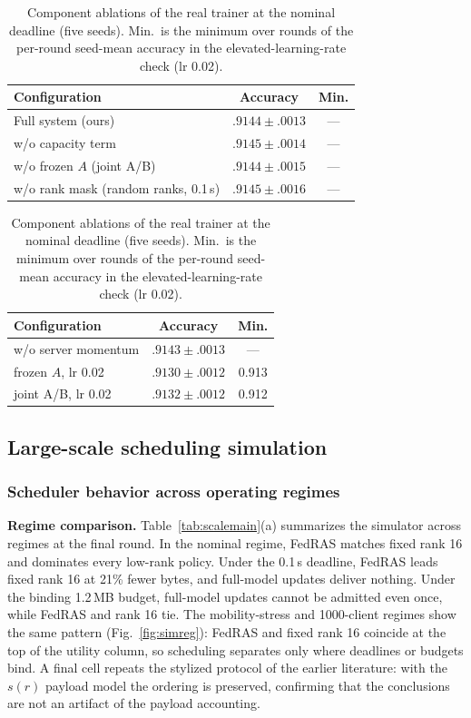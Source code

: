\documentclass[a4paper,fleqn]{cas-dc}
\begin{document}
\begin{table}[pos=tbp]
\centering\footnotesize
\caption{Component ablations of the real trainer at the nominal deadline (five seeds). Min.\ is the minimum over rounds of the per-round seed-mean accuracy in the elevated-learning-rate check (lr 0.02).}
\label{tab:ablation}
\begin{tabular}{l cc}
\toprule
Configuration & Accuracy & Min.\\
\midrule
Full system (ours) & $.9144\pm.0013$ & ---\\
w/o capacity term & $.9145\pm.0014$ & ---\\
w/o frozen $A$ (joint A/B) & $.9144\pm.0015$ & ---\\
w/o rank mask (random ranks, 0.1\,s) & $.9145\pm.0016$ & ---\\
\end{tabular}
\hfill
\begin{tabular}{l cc}
\toprule
Configuration & Accuracy & Min.\\
\midrule
w/o server momentum & $.9143\pm.0013$ & ---\\
frozen $A$, lr 0.02 & $.9130\pm.0012$ & 0.913\\
joint A/B, lr 0.02 & $.9132\pm.0012$ & 0.912\\
\bottomrule
\end{tabular}
\end{table}


\subsection{Large-scale scheduling simulation}

\subsubsection{Scheduler behavior across operating regimes}
\label{sec:simsim}
\textbf{Regime comparison.} Table~\ref{tab:scalemain}(a) summarizes the simulator across regimes at the final round. In the nominal regime, FedRAS matches fixed rank 16 and dominates every low-rank policy. Under the 0.1\,s deadline, FedRAS leads fixed rank 16 at 21\% fewer bytes, and full-model updates deliver nothing. Under the binding 1.2\,MB budget, full-model updates cannot be admitted even once, while FedRAS and rank 16 tie. The mobility-stress and 1000-client regimes show the same pattern (Fig.~\ref{fig:simreg}): FedRAS and fixed rank 16 coincide at the top of the utility column, so scheduling separates only where deadlines or budgets bind. A final cell repeats the stylized protocol of the earlier literature: with the $s(r)$ payload model the ordering is preserved, confirming that the conclusions are not an artifact of the payload accounting.
\end{document}

